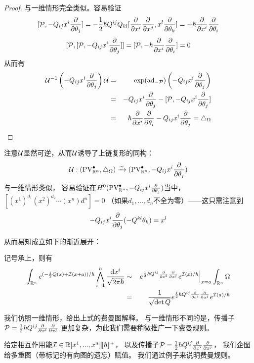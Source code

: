 \begin{proof}
与一维情形完全类似。容易验证
$$[\mathcal{P},-Q_{ij}x^i\frac{\partial } {\partial \theta_j}]=
  -\frac{1}{2}\hbar Q^{ij}Q_{kl}
  [\frac{\partial } {\partial x^i}\frac{\partial } {\partial x^j},x^l\frac{\partial } {\partial \theta_k}]
=
  -\hbar\frac{\partial } {\partial x^i}\frac{\partial } {\partial \theta_i}
$$
$$[\mathcal{P},[\mathcal{P},-Q_{ij}x^i\frac{\partial } {\partial \theta_j}]]
=[\mathcal{P},-\hbar\frac{\partial } {\partial x^i}\frac{\partial } {\partial \theta_i}]=0$$
从而有
\begin{eqnarray*}
     \mathcal{U}^{-1}
     \left(
       -Q_{ij}x^i\frac{\partial } {\partial \theta_j}
     \right)\mathcal{U}
&=&
     \exp(\operatorname{ad}_{-\mathcal{P}})
     \left(
       -Q_{ij}x^i\frac{\partial } {\partial \theta_j}
     \right)\\
&=&
     -Q_{ij}x^i\frac{\partial } {\partial \theta_j}
     -[\mathcal{P},-Q_{ij}x^i\frac{\partial } {\partial \theta_j}]\\
&=&
     \hbar\frac{\partial } {\partial x^i}\frac{\partial } {\partial \theta_i}
    -Q_{ij}x^i\frac{\partial } {\partial \theta_j}=\triangle_\Omega
\end{eqnarray*}
\end{proof}

注意$\mathcal{U}$显然可逆，从而$\mathcal{U}$诱导了上链复形的同构：
$$
  \mathcal{U}:(\operatorname{PV}_{\mathbb{R}^n}^{\bullet},\triangle_\Omega)
  \xrightarrow{\sim}
  (\operatorname{PV}_{\mathbb{R}^n}^{\bullet},-Q_{ij}x^i\frac{\partial } {\partial \theta_j})
$$
与一维情形类似，
容易验证在$H^0(\operatorname{PV}_{\mathbb{R}^n}^{\bullet},-Q_{ij}x^i\frac{\partial } {\partial \theta_j})$当中，
$[(x^1)^{d_1}(x^2)^{d_2}\cdots(x^n)d^n]=0$
（如果$d_1,...,d_n$不全为零）——这只需注意到
$$-Q_{ij}x^i\frac{\partial } {\partial \theta_j}(-Q^{kl}\theta_k)=x^l$$

从而易知成立如下的渐近展开：
\begin{prop}记号承上，则有
\begin{eqnarray*}
     \int_{\mathbb{R}^n}
       e^{
           (-\frac{1}{2}Q(x)
          +\mathcal{I}(x+a))/\hbar
         }
       \bigwedge_{i=1}^n
         \frac{\mathrm{d} x^i}
              {\sqrt{2\pi\hbar}}
&\sim&
     \left.
       e^{\frac{1}{2}\hbar Q^{ij}\frac{\partial } {\partial x^i}\frac{\partial } {\partial x^j}}
       e^{\mathcal{I}(x)/\hbar}
     \right|_{x=a}
     \int_{\mathbb{R}^n}\Omega\\
&=&
     \frac{1}{\sqrt{\det Q}}
     e^{\frac{1}{2}\hbar Q^{ij}\frac{\partial } {\partial a^i}\frac{\partial } {\partial a^j}}
     e^{\mathcal{I}(a)/\hbar}
\end{eqnarray*}
\end{prop}

我们仿照一维情形，给出上式的费曼图解释。
与一维情形不同的是，传播子
$\mathcal{P}=\frac{1}{2}\hbar Q^{ij}\frac{\partial } {\partial x^i}\frac{\partial } {\partial x^j}$
更加复杂，为此我们需要稍微推广一下费曼规则。

给定相互作用能$\mathcal{I}\in\mathbb{R}[x^1,...,x^n][\![\hbar]\!]^+$，
以及传播子$\mathcal{P}=\frac{1}{2}\hbar Q^{ij}\frac{\partial } {\partial x^i}\frac{\partial } {\partial x^j}$，
我们企图给多重图（带标记的有向图的遗忘）赋值。
我们通过例子来说明费曼规则。

